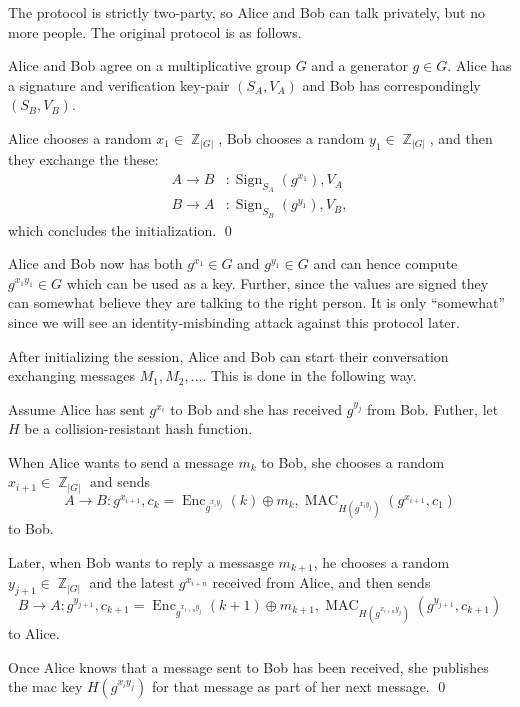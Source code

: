 \documentclass[draft]{llncs}
\DeclareMathOperator{\sign}{\mathrm{Sign}}
\DeclareMathOperator{\enc}{\mathrm{Enc}}
\DeclareMathOperator{\mac}{\mathrm{MAC}}
\newcommand{\ord}[1]{|#1|}
\DeclareMathOperator{\Z}{\mathbb Z}
\begin{document}
The protocol is strictly two-party, so Alice and Bob can talk privately, but no 
more people.
The original protocol \cite{otr2004} is as follows.

\begin{protocol}\label{proto:otr1init}
  Alice and Bob agree on a multiplicative group \(G\) and a generator \(g\in 
  G\).
  Alice has a signature and verification key-pair \((S_A, V_A)\) and Bob has 
  correspondingly \((S_B, V_B)\).

  Alice chooses a random \(x_1\in \Z_{\ord G}\),
  Bob chooses a random \(y_1\in \Z_{\ord G}\),
  and then they exchange the these:
  \begin{align*}
    A\to B&\colon \sign_{S_A}( g^{x_1} ), V_A \\
    B\to A&\colon \sign_{S_B}( g^{y_1} ), V_B,
  \end{align*}
  which concludes the initialization.
  \qed
\end{protocol}

Alice and Bob now has both \(g^{x_1}\in G\) and \(g^{y_1}\in G\) and can hence 
compute \(g^{x_1 y_1}\in G\) which can be used as a key.
Further, since the values are signed they can somewhat believe they are talking 
to the right person.
It is only \enquote{somewhat} since we will see an identity-misbinding attack 
against this protocol later.

After initializing the session, Alice and Bob can start their conversation 
exchanging messages \(M_1, M_2, \ldots\).
This is done in the following way.

\begin{protocol}\label{proto:otr1comm}
  Assume Alice has sent \(g^{x_i}\) to Bob and she has received \(g^{y_j}\) 
  from Bob.
  Futher, let \(H\) be a collision-resistant hash function.

  When Alice wants to send a message \(m_k\) to Bob, she chooses a random 
  \(x_{i+1}\in\Z_{\ord G}\) and sends
  \begin{equation*}
    A\to B\colon g^{x_{i+1}},
      c_k = \enc_{g^{x_i y_j}}( k )\oplus m_k,
      \mac_{H( g^{x_i y_j} )}( g^{x_{i+1}}, c_1 )
  \end{equation*}
  to Bob.

  Later, when Bob wants to reply a messasge \(m_{k+1}\), he chooses a random 
  \(y_{j+1}\in\Z_{\ord G}\) and the latest \(g^{x_{i+n}}\) received from Alice, 
  and then sends
  \begin{equation*}
    B\to A\colon g^{y_{j+1}},
    c_{k+1} = \enc_{g^{x_{i+n} y_j}}( k+1 )\oplus m_{k+1},
    \mac_{H( g^{x_{i+n} y_j} )}( g^{y_{j+1}}, c_{k+1} )
  \end{equation*}
  to Alice.

  Once Alice knows that a message sent to Bob has been received, she publishes 
  the \ac{mac} key \( H( g^{x_i y_j} ) \) for that message as part of her next 
  message.
  \qed
\end{protocol}
\end{document}
